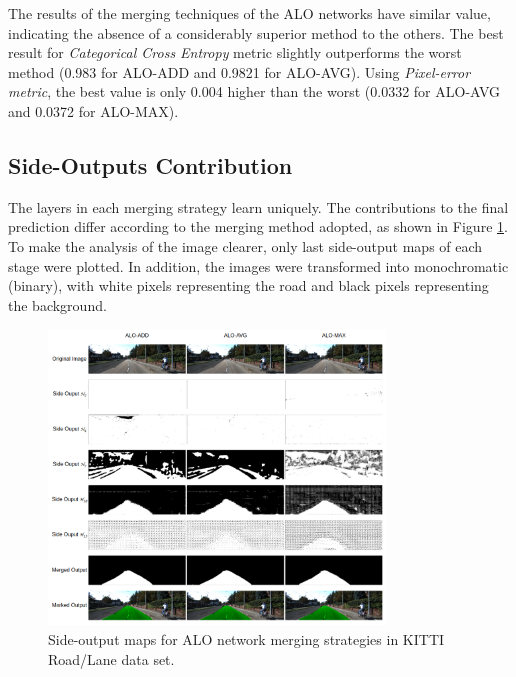 The results of the merging techniques of the ALO networks have similar value, indicating the absence of a considerably superior method to the others.
The best result for \textit{Categorical Cross Entropy} metric slightly outperforms the worst method (0.983 for ALO-ADD and 0.9821 for ALO-AVG).
Using \textit{Pixel-error metric}, the best value is only 0.004 higher than the worst (0.0332 for ALO-AVG and 0.0372 for ALO-MAX).

\subsection{Side-Outputs Contribution}
\label{cap6_contribuicoes_saidas_intermediarias}

The layers in each merging strategy learn uniquely.
The contributions to the final prediction differ according to the merging method adopted, as shown in Figure \ref{fig:kitti_side_outputs}.
To make the analysis of the image clearer, only last side-output maps of each stage were plotted.
In addition, the images were transformed into monochromatic (binary), with white pixels representing the road and black pixels representing the background.


\begin{figure}
  \centering
  \includegraphics[width=0.8\textwidth]{../imagens/ilustracoes/cap6_kitti_side_outputs.png}
  \caption{Side-output maps for ALO network merging strategies in KITTI Road/Lane data set.}
  \label{fig:kitti_side_outputs}
\end{figure}

